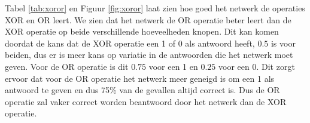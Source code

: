 Tabel \ref{tab:xoror} en Figuur \ref{fig:xoror} laat zien hoe goed het netwerk de operaties XOR en OR leert. We zien dat het netwerk de OR operatie beter leert dan de XOR operatie op beide verschillende hoeveelheden knopen. Dit kan komen doordat de kans dat de XOR operatie een 1 of 0 als antwoord heeft, $0.5$ is voor beiden, dus er is meer kans op variatie in de antwoorden die het netwerk moet geven. Voor de OR operatie is dit $0.75$ voor een 1 en $0.25$ voor een 0. Dit zorgt ervoor dat voor de OR operatie het netwerk meer geneigd is om een 1 als antwoord te geven en dus 75\% van de gevallen altijd correct is. Dus de OR operatie zal vaker correct worden beantwoord door het netwerk dan de XOR operatie.
